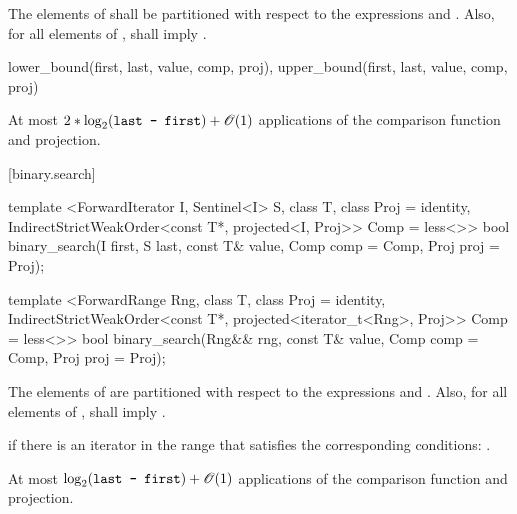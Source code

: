 \begin{itemdescr}
\pnum
\requires
The elements
of
shall be partitioned with respect to the expressions
and
.
Also, for all elements
of
\tcode{[first, last)},
shall imply
.

\pnum
\returns
\begin{codeblock}
{lower_bound(first, last, value, comp, proj),
 upper_bound(first, last, value, comp, proj)}
\end{codeblock}

\pnum
\complexity
At most
$2 * \log_2(\texttt{last - first}) + \mathscr{O}(1)$
applications of the comparison function and projection.
\end{itemdescr}

[binary.search]{}

%
\begin{itemdecl}
template <ForwardIterator I, Sentinel<I> S, class T, class Proj = identity,
    IndirectStrictWeakOrder<const T*, projected<I, Proj>> Comp = less<>>
  bool
    binary_search(I first, S last, const T& value, Comp comp = Comp{},
                  Proj proj = Proj{});

template <ForwardRange Rng, class T, class Proj = identity,
    IndirectStrictWeakOrder<const T*, projected<iterator_t<Rng>, Proj>> Comp = less<>>
  bool
    binary_search(Rng&& rng, const T& value, Comp comp = Comp{},
                  Proj proj = Proj{});
\end{itemdecl}

\begin{itemdescr}
\pnum
\requires
The elements
of
are partitioned with respect to the expressions
and
.
Also, for all elements
of
\tcode{[first, last)},
shall imply
.

\pnum
\returns
{}
if there is an iterator
in the range
that satisfies the corresponding conditions:
.

\pnum
\complexity
At most
$\log_2(\texttt{last - first}) + \mathscr{O}(1)$
applications of the comparison function and projection.
\end{itemdescr}

